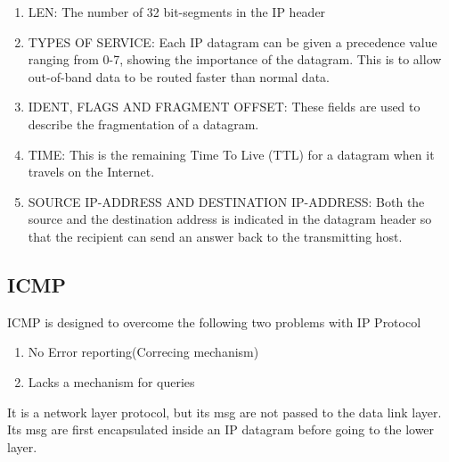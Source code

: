 \documentclass[12pt,a4paper]{article}
\begin{document}
 \begin{enumerate}
\item LEN: The number of 32 bit-segments in the IP header\\
\item TYPES OF SERVICE: Each IP datagram can be given a precedence value ranging from 0-7, showing the importance of the datagram. This is to allow out-of-band data to be routed faster than normal data. \\
\item IDENT, FLAGS AND FRAGMENT OFFSET: These fields are used to describe the fragmentation of a datagram. \\
\item TIME: This is the remaining Time To Live (TTL) for a datagram when it travels on the Internet.\\
\item SOURCE IP-ADDRESS AND DESTINATION IP-ADDRESS: Both the source and the destination address is indicated in the datagram header so that the recipient can send an answer back to the transmitting host.
\end{enumerate}
 \pagebreak
\subsection{ICMP}
ICMP is designed to overcome the following two problems with IP Protocol\\
 \begin{enumerate}
\item No Error reporting(Correcing mechanism)
\item Lacks a mechanism for queries
\end{enumerate}

It is a network layer protocol, but its msg are not passed to the data link layer. Its msg are first encapsulated inside an IP datagram before going to the lower layer.\\
\end{document}
